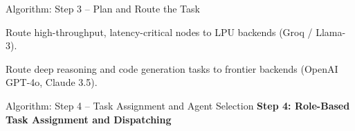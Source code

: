\documentclass[aspectratio=169,10pt]{beamer}
\begin{document}
\begin{frame}[t]{Algorithm: Step 3 -- Plan and Route the Task}
\begin{algolist}
    \vspace{0.15em}
    \begin{algosublist}
      \item[3.3.1] Route high-throughput, latency-critical nodes to LPU backends (Groq / Llama-3).
      \item[3.3.2] Route deep reasoning and code generation tasks to frontier backends (OpenAI GPT-4o, Claude 3.5).
    \end{algosublist}
\end{algolist}
\end{frame}

\begin{frame}[t]{Algorithm: Step 4 -- Task Assignment and Agent Selection}
\vspace{-0.15em}
{\large\bfseries\color{lavenderDark}Step 4: Role-Based Task Assignment and Dispatching}
\vspace{0.15em}


\end{frame}
\end{document}
